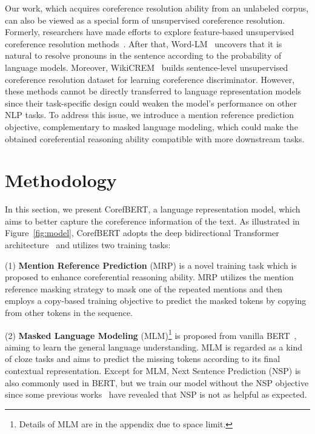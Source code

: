 \documentclass[11pt,a4paper]{article}
\newcommand\CorefBERT{CorefBERT\xspace}
\begin{document}
Our work, which acquires coreference resolution ability from an unlabeled corpus, can also be viewed as a special form of unsupervised coreference resolution.
Formerly, researchers have made efforts to explore feature-based unsupervised coreference resolution methods~\citep{UnsupervisedModelsforCoreferenceResolution, UnsupervisedRankingModelforEntityCoreferenceResolution}. After that, Word-LM~\citep{ASimpleMethodforCommonsenseReasoning} uncovers that it is natural to resolve pronouns in the sentence according to the probability of language models. Moreover, WikiCREM~\citep{wikicrem} 
builds sentence-level unsupervised coreference resolution dataset for learning coreference discriminator. 
However, these methods cannot be directly transferred to language representation models since their task-specific design could  weaken the model's performance on other NLP tasks. To address this issue, we introduce a mention reference prediction objective, complementary to masked language modeling, which could make the obtained coreferential reasoning ability compatible with more downstream tasks.
\section{Methodology}
In this section, we present \CorefBERT, a language representation model, which aims to better capture the coreference information of the text. As illustrated in Figure~\ref{fig:model}, \CorefBERT adopts the deep bidirectional Transformer architecture~\citep{Transformer} and utilizes two training tasks: 

(1) \textbf{Mention Reference Prediction} (MRP) is a novel  training task which is proposed to  enhance coreferential reasoning ability.
MRP utilizes the mention reference masking strategy to mask one of the  repeated mentions and then employs a copy-based training objective to predict the masked tokens by copying from other tokens in the sequence.

(2) \textbf{Masked Language Modeling} (MLM)\footnote{Details of MLM are in the appendix due to space limit.} is proposed  from vanilla BERT~\citep{BERT}, aiming to learn the general language understanding. MLM is regarded as a kind of cloze tasks and aims to predict the missing tokens according to its final contextual representation. Except for MLM, Next Sentence Prediction (NSP) is also commonly used in BERT, but we train our model without the NSP objective since some previous works~\citep{Roberta, Spanbert} have revealed that NSP is not as helpful as expected.
\end{document}
